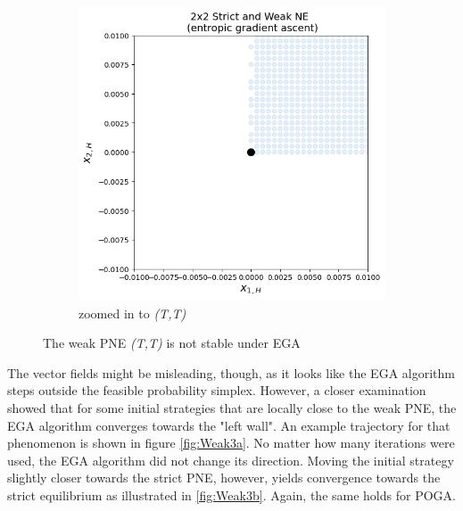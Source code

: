 \begin{figure}[H]
\begin{subfigure}{.52\textwidth}
    \includegraphics[width=\textwidth]{logos/Weak4.png}
    \caption{zoomed in to \textit{(T,T)}}
    \label{fig:Weak2b}
\end{subfigure}
\caption{The weak PNE \textit{(T,T)} is not stable under EGA}
\label{fig:2x2Weak2}
\end{figure}

The vector fields might be misleading, though, as it looks like the EGA algorithm steps outside the feasible probability simplex. However, a closer examination showed that for some initial strategies that are locally close to the weak PNE, the EGA algorithm converges towards the "left wall". An example trajectory for that phenomenon is shown in figure \ref{fig:Weak3a}. No matter how many iterations were used, the EGA algorithm did not change its direction. Moving the initial strategy slightly closer towards the strict PNE, however, yields convergence towards the strict equilibrium as illustrated in \ref{fig:Weak3b}. Again, the same holds for POGA. \\


